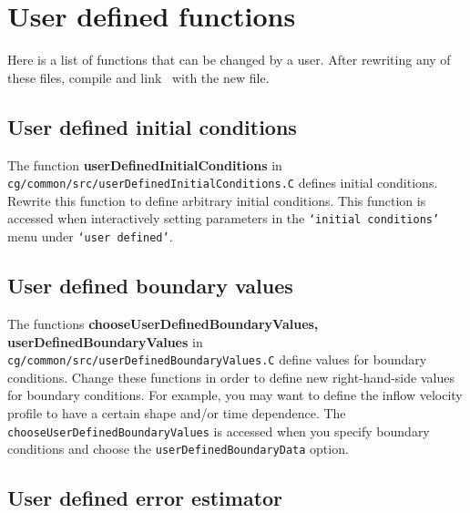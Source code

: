 \section{User defined functions}\label{sec:userDefinedFunctions}

Here is a list of functions that can be changed by a user. After rewriting any of these files,
compile and link \solver\ with the new file.

\subsection{User defined initial conditions}\label{sec:userDefinedInitialConditions} 

 The function {\bf userDefinedInitialConditions} in {\tt
cg/common/src/userDefinedInitialConditions.C} defines initial conditions.
Rewrite this function to define arbitrary initial conditions. This function is
accessed when interactively setting parameters in the {\tt `initial conditions'}
menu under {\tt `user defined'}.


\subsection{User defined boundary values}\label{sec:userDefinedBoundaryValues}

  The functions {\bf choose\-User\-Defined\-Boundary\-Values, user\-Defined\-Boundary\-Values}
in {\tt cg/\-common/\-src/\-userDefinedBoundaryValues.C} define values for boundary
conditions. Change these functions in order to define new right-hand-side values
for boundary conditions. For example, you may want to define the inflow velocity
profile to have a certain shape and/or time dependence.  The {\tt
chooseUserDefinedBoundaryValues} is accessed when you specify boundary
conditions and choose the {\tt userDefinedBoundaryData} option.


\subsection{User defined error estimator}\label{sec:userDefinedErrorEstimator}


